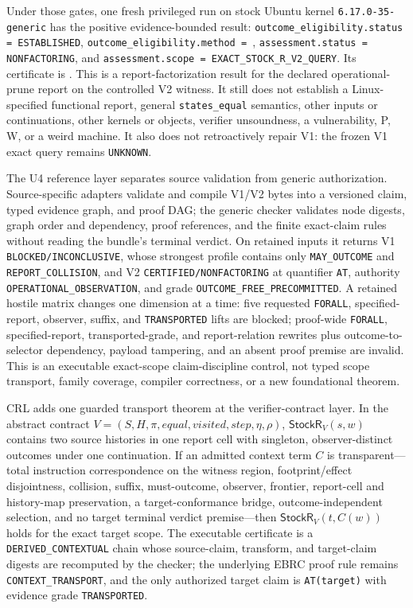 \documentclass[conference]{IEEEtran}
\begin{document}
Under those gates, one fresh privileged run on stock Ubuntu kernel \texttt{6.17.0-35-generic} has the positive evidence-bounded result: \texttt{outcome\_eligibility.status = ESTABLISHED}, \texttt{outcome\_eligibility.method = }, \texttt{assessment.status = NONFACTORING}, and \texttt{assessment.scope = EXACT\_STOCK\_R\_V2\_QUERY}. Its certificate is . This is a report-factorization result for the declared operational-prune report on the controlled V2 witness. It still does not establish a Linux-specified functional report, general \texttt{states\_equal} semantics, other inputs or continuations, other kernels or objects, verifier unsoundness, a vulnerability, P, W, or a weird machine. It also does not retroactively repair V1: the frozen V1 exact query remains \texttt{UNKNOWN}.

The U4 reference layer separates source validation from generic authorization. Source-specific adapters validate and compile V1/V2 bytes into a versioned claim, typed evidence graph, and proof DAG; the generic checker validates node digests, graph order and dependency, proof references, and the finite exact-claim rules without reading the bundle's terminal verdict. On retained inputs it returns V1 \texttt{BLOCKED/INCONCLUSIVE}, whose strongest profile contains only \texttt{MAY\_OUTCOME} and \texttt{REPORT\_COLLISION}, and V2 \texttt{CERTIFIED/NONFACTORING} at quantifier \texttt{AT}, authority \texttt{OPERATIONAL\_OBSERVATION}, and grade \texttt{OUTCOME\_FREE\_PRECOMMITTED}. A retained hostile matrix changes one dimension at a time: five requested \texttt{FORALL}, specified-report, observer, suffix, and \texttt{TRANSPORTED} lifts are blocked; proof-wide \texttt{FORALL}, specified-report, transported-grade, and report-relation rewrites plus outcome-to-selector dependency, payload tampering, and an absent proof premise are invalid. This is an executable exact-scope claim-discipline control, not typed scope transport, family coverage, compiler correctness, or a new foundational theorem.

CRL adds one guarded transport theorem at the verifier-contract layer. In the abstract contract $V=(S,H,\pi,\mathit{equal},\mathit{visited},\mathit{step},\eta,\rho)$, $\mathsf{StockR}_V(s,w)$ contains two source histories in one report cell with singleton, observer-distinct outcomes under one continuation. If an admitted context term $C$ is transparent---total instruction correspondence on the witness region, footprint/effect disjointness, collision, suffix, must-outcome, observer, frontier, report-cell and history-map preservation, a target-conformance bridge, outcome-independent selection, and no target terminal verdict premise---then $\mathsf{StockR}_V(t,C(w))$ holds for the exact target scope. The executable certificate is a \texttt{DERIVED\_CONTEXTUAL} chain whose source-claim, transform, and target-claim digests are recomputed by the checker; the underlying EBRC proof rule remains \texttt{CONTEXT\_TRANSPORT}, and the only authorized target claim is \texttt{AT(target)} with evidence grade \texttt{TRANSPORTED}.
\end{document}
